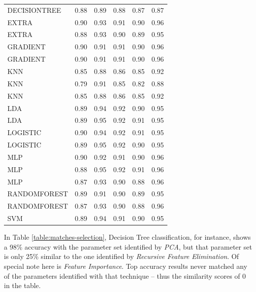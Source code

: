 \documentclass[letterpaper]{article}
\begin{document}
{\begin{small}
{\begin{longtable}{lrrrrr}
\bottomrule
\endlastfoot
DECISIONTREE &       0.88 &    0.89 & 0.88 & 0.87 & 0.87 \\
       EXTRA &       0.90 &    0.93 & 0.91 & 0.90 & 0.96 \\
       EXTRA &       0.88 &    0.93 & 0.90 & 0.89 & 0.95 \\
    GRADIENT &       0.90 &    0.91 & 0.91 & 0.90 & 0.96 \\
    GRADIENT &       0.90 &    0.91 & 0.91 & 0.90 & 0.96 \\
         KNN &       0.85 &    0.88 & 0.86 & 0.85 & 0.92 \\
         KNN &       0.79 &    0.91 & 0.85 & 0.82 & 0.88 \\
         KNN &       0.85 &    0.88 & 0.86 & 0.85 & 0.92 \\
         LDA &       0.89 &    0.94 & 0.92 & 0.90 & 0.95 \\
         LDA &       0.89 &    0.95 & 0.92 & 0.91 & 0.95 \\
    LOGISTIC &       0.90 &    0.94 & 0.92 & 0.91 & 0.95 \\
    LOGISTIC &       0.89 &    0.95 & 0.92 & 0.90 & 0.95 \\
         MLP &       0.90 &    0.92 & 0.91 & 0.90 & 0.96 \\
         MLP &       0.88 &    0.95 & 0.92 & 0.91 & 0.96 \\
         MLP &       0.87 &    0.93 & 0.90 & 0.88 & 0.96 \\
RANDOMFOREST &       0.89 &    0.91 & 0.90 & 0.89 & 0.95 \\
RANDOMFOREST &       0.87 &    0.93 & 0.90 & 0.88 & 0.96 \\
         SVM &       0.89 &    0.94 & 0.91 & 0.90 & 0.95 \\
\end{longtable}


}
\end{small}

In Table \ref{table:matches-selection}, Decision Tree classification, for instance, shows a 98\% accuracy with the parameter set identified by \textit{PCA}, but that parameter set is only 25\% similar to the one identified by \textit{Recursive Feature Elimination}. Of special note here is \textit{Feature Importance}. Top accuracy results never matched any of the parameters identified with that technique -- thus the similarity scores of 0 in the table.

\begin{small}
{
\renewcommand{\arraystretch}{0.9}

}
\end{small}}
\end{document}
